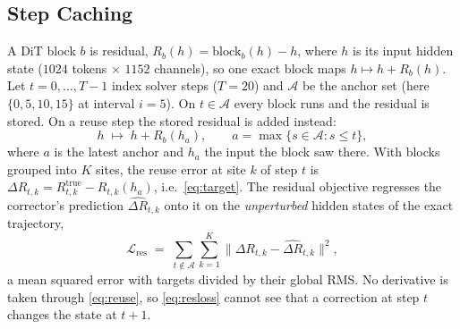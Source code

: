 \documentclass[conference,compsoc]{IEEEtran}
\newcommand{\dR}{\Delta R}
\begin{document}
\subsection{Step Caching}
A DiT block $b$ is residual,
$R_b(h)=\mathrm{block}_b(h)-h$, where $h$ is its input hidden state
($1024$ tokens $\times$ $1152$ channels), so one exact block maps
$h\mapsto h+R_b(h)$.
Let $t=0,\dots,T{-}1$ index solver steps ($T{=}20$) and $\mathcal{A}$ be the
anchor set (here $\{0,5,10,15\}$ at interval $i{=}5$).
On $t\in\mathcal{A}$ every block runs and the residual is stored. On a reuse
step the stored residual is added instead:
\begin{equation}
h \;\mapsto\; h + R_b(h_a),\qquad
a=\max\{s\in\mathcal{A}:s\le t\},
\label{eq:reuse}
\end{equation}
where $a$ is the latest anchor and $h_a$ the input the block saw there. With
blocks grouped into $K$ sites, the reuse error at site $k$ of step $t$ is
$\dR_{t,k}=R_{t,k}^{\mathrm{true}}-R_{t,k}(h_a)$, i.e.\
\eqref{eq:target}. The residual objective regresses the corrector's
prediction $\widehat{\dR}_{t,k}$ onto it on the
\emph{unperturbed} hidden states of the exact trajectory,
\begin{equation}
\mathcal{L}_{\mathrm{res}}
\;=\;
\sum_{t\notin\mathcal{A}}\sum_{k=1}^{K}
\|\dR_{t,k}-\widehat{\dR}_{t,k}\|^2,
\label{eq:resloss}
\end{equation}
a mean squared error with targets divided by their global RMS.
No derivative is taken through \eqref{eq:reuse}, so \eqref{eq:resloss} cannot
see that a correction at step $t$ changes the state at $t{+}1$.
\end{document}
